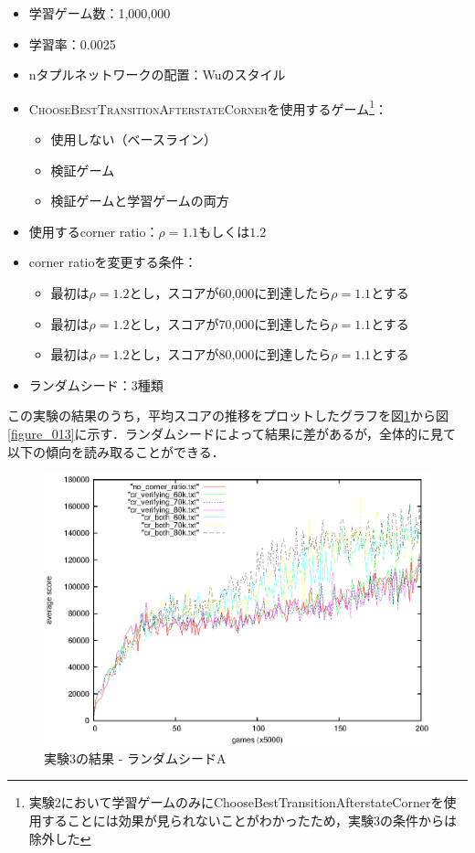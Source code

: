 \documentclass{suribt}
\begin{document}
\begin{itemize}
\item 学習ゲーム数：1,000,000
\item 学習率：0.0025
\item nタプルネットワークの配置：Wuのスタイル
\item \textsc{ChooseBestTransitionAfterstateCorner}を使用するゲーム\footnote{実験2において学習ゲームのみにChooseBestTransitionAfterstateCornerを使用することには効果が見られないことがわかったため，実験3の条件からは除外した}：
\begin{itemize}
\item 使用しない（ベースライン）
\item 検証ゲーム
\item 検証ゲームと学習ゲームの両方
\end{itemize}
\item 使用するcorner ratio：${\rho}=1.1 \text{もしくは} 1.2$
\item corner ratioを変更する条件：
\begin{itemize}
\item 最初は${\rho}=1.2$とし，スコアが60,000に到達したら${\rho}=1.1$とする
\item 最初は${\rho}=1.2$とし，スコアが70,000に到達したら${\rho}=1.1$とする
\item 最初は${\rho}=1.2$とし，スコアが80,000に到達したら${\rho}=1.1$とする
\end{itemize}
\item ランダムシード：3種類
\end{itemize}

この実験の結果のうち，平均スコアの推移をプロットしたグラフを図\ref{figure_011}から図\ref{figure_013}に示す．ランダムシードによって結果に差があるが，全体的に見て以下の傾向を読み取ることができる．

\begin{figure}[tb]
	\begin{center}
	\includegraphics[width=13cm]{figure_011.eps}
	\caption{実験3の結果 - ランダムシードA}
	\label{figure_011}
	\end{center}
\end{figure}
\end{document}
